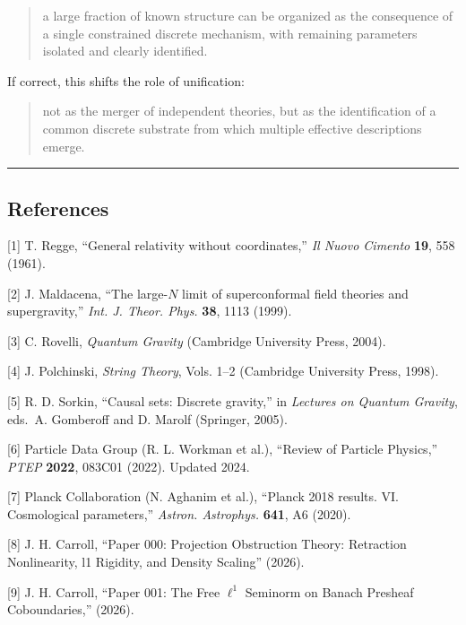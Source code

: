 \documentclass[
]{article}
\begin{document}
\begin{quote}
a large fraction of known structure can be organized as the consequence
of a single constrained discrete mechanism, with remaining parameters
isolated and clearly identified.
\end{quote}

If correct, this shifts the role of unification:

\begin{quote}
not as the merger of independent theories, but as the identification of
a common discrete substrate from which multiple effective descriptions
emerge.
\end{quote}

\begin{center}\rule{0.5\linewidth}{0.5pt}\end{center}

\hypertarget{references}{%
\subsection{References}\label{references}}

{[}1{]} T. Regge, ``General relativity without coordinates,'' \emph{Il
Nuovo Cimento} \textbf{19}, 558 (1961).

{[}2{]} J. Maldacena, ``The large-\(N\) limit of superconformal field
theories and supergravity,'' \emph{Int. J. Theor. Phys.} \textbf{38},
1113 (1999).

{[}3{]} C. Rovelli, \emph{Quantum Gravity} (Cambridge University Press,
2004).

{[}4{]} J. Polchinski, \emph{String Theory}, Vols. 1--2 (Cambridge
University Press, 1998).

{[}5{]} R. D. Sorkin, ``Causal sets: Discrete gravity,'' in
\emph{Lectures on Quantum Gravity}, eds.~A. Gomberoff and D. Marolf
(Springer, 2005).

{[}6{]} Particle Data Group (R. L. Workman et al.), ``Review of Particle
Physics,'' \emph{PTEP} \textbf{2022}, 083C01 (2022). Updated 2024.

{[}7{]} Planck Collaboration (N. Aghanim et al.), ``Planck 2018 results.
VI. Cosmological parameters,'' \emph{Astron. Astrophys.} \textbf{641},
A6 (2020).

{[}8{]} J. H. Carroll, ``Paper 000: Projection Obstruction Theory:
Retraction Nonlinearity, l1 Rigidity, and Density Scaling'' (2026).

{[}9{]} J. H. Carroll, ``Paper 001: The Free \(\ell^1\) Seminorm on
Banach Presheaf Coboundaries,'' (2026).
\end{document}
